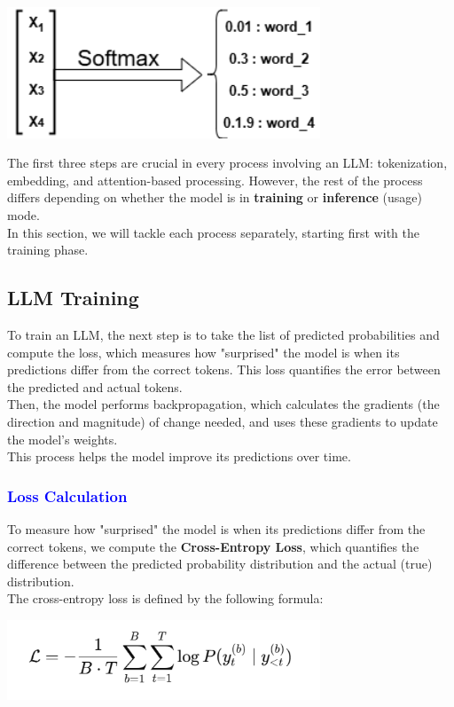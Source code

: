 \documentclass[12pt]{article}
\begin{document}
\begin{center}
    \includegraphics[width=0.7\textwidth]{images/llm12.png}
\end{center}

\newpage
\vspace*{1cm}
The first three steps are crucial in every process involving an LLM: tokenization, embedding, and attention-based processing. However, the rest of the process differs depending on whether the model is in \textbf{training} or \textbf{inference} (usage) mode.\\
In this section, we will tackle each process separately, starting first with the training phase.
\subsection{LLM Training}
To train an LLM, the next step is to take the list of predicted probabilities and compute the loss, which measures how "surprised" the model is when its predictions differ from the correct tokens. This loss quantifies the error between the predicted and actual tokens.\\Then, the model performs backpropagation, which calculates the gradients (the direction and magnitude) of change needed, and uses these gradients to update the model's weights.\\This process helps the model improve its predictions over time.
\textcolor{blue}{\subsubsection{Loss Calculation}}
To measure how "surprised" the model is when its predictions differ from the correct tokens, we compute the \textbf{Cross-Entropy Loss}, which quantifies the difference between the predicted probability distribution and the actual (true) distribution.\\The cross-entropy loss is defined by the following formula:
\begin{center}
    \includegraphics[width=0.7\textwidth]{images/formula8.png}
\end{center}
\end{document}
